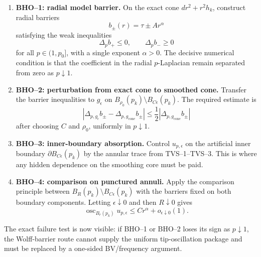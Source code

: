 \begin{remark}
\begin{enumerate}
    \item \textbf{BHO--1: radial model barrier.}
    On the exact cone \(dr^2+r^2h_k\), construct radial barriers
    \[
        b_\pm(r)=\tau\pm A r^\alpha
    \]
    satisfying the weak inequalities
    \[
        \Delta_p b_+\le 0,\qquad \Delta_p b_-\ge0
    \]
    for all \(p\in(1,p_0]\), with a single exponent \(\alpha>0\).  The
    decisive numerical condition is that the coefficient in the radial
    \(p\)-Laplacian remain separated from zero as \(p\downarrow1\).

    \item \textbf{BHO--2: perturbation from exact cone to smoothed cone.}
    Transfer the barrier inequalities to \(g_\epsilon\) on
    \(B_{\rho_0}(p_k)\setminus B_{C\epsilon}(p_k)\).  The required estimate is
    \[
        |\Delta_{p,g_\epsilon}b_\pm-\Delta_{p,g_{\mathrm{cone}}}b_\pm|
        \le \frac12
        |\Delta_{p,g_{\mathrm{cone}}}b_\pm|
    \]
    after choosing \(C\) and \(\rho_0\), uniformly in \(p\downarrow1\).

    \item \textbf{BHO--3: inner-boundary absorption.}
    Control \(u_{p,\epsilon}\) on the artificial inner boundary
    \(\partial B_{C\epsilon}(p_k)\) by the annular trace from TVS--1--TVS--3.
    This is where any hidden dependence on the smoothing core must be paid.

    \item \textbf{BHO--4: comparison on punctured annuli.}
    Apply the comparison principle between
    \(B_R(p_k)\setminus B_{C\epsilon}(p_k)\) with the barriers fixed on both
    boundary components.  Letting \(\epsilon\downarrow0\) and then
    \(R\downarrow0\) gives
    \[
        \operatorname{osc}_{B_r(p_k)}u_{p,\epsilon}
        \le C r^\alpha+o_{\epsilon\downarrow0}(1).
    \]
\end{enumerate}
The exact failure test is now visible: if BHO--1 or BHO--2 loses its sign as
\(p\downarrow1\), the Wolff-barrier route cannot supply the uniform
tip-oscillation package and must be replaced by a one-sided BV/frequency
argument.
\end{remark}

